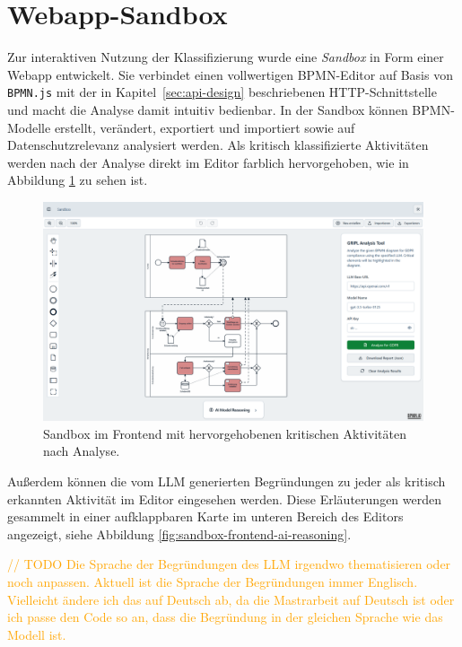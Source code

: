 \section{Webapp-Sandbox}\label{sec:nutzung-uber-webapp}

Zur interaktiven Nutzung der Klassifizierung wurde eine \emph{Sandbox} in Form einer Webapp entwickelt. Sie verbindet einen vollwertigen \ac{BPMN}-Editor auf Basis von \texttt{BPMN.js} \cite{bpmn-js} mit der in Kapitel~\ref{sec:api-design} beschriebenen HTTP-Schnittstelle und macht die Analyse damit intuitiv bedienbar. In der Sandbox können \ac{BPMN}-Modelle erstellt, verändert, exportiert und importiert sowie auf Datenschutzrelevanz analysiert werden. Als kritisch klassifizierte Aktivitäten werden nach der Analyse direkt im Editor farblich hervorgehoben, wie in Abbildung \ref{fig:sandbox-frontend-analyzed-model} zu sehen ist.

\begin{figure}
    \centering
    \includegraphics[width=\linewidth]{images/sandbox/sandbox-analyzed-model}
    \caption{Sandbox im Frontend mit hervorgehobenen kritischen Aktivitäten nach Analyse.}
    \label{fig:sandbox-frontend-analyzed-model}
\end{figure}

Außerdem können die vom \ac{LLM} generierten Begründungen zu jeder als kritisch erkannten Aktivität im Editor eingesehen werden. Diese Erläuterungen werden gesammelt in einer aufklappbaren Karte im unteren Bereich des Editors angezeigt, siehe Abbildung \ref{fig:sandbox-frontend-ai-reasoning}.

\textcolor{orange}{// TODO Die Sprache der Begründungen des LLM irgendwo thematisieren oder noch anpassen. Aktuell ist die Sprache der Begründungen immer Englisch. Vielleicht ändere ich das auf Deutsch ab, da die Mastrarbeit auf Deutsch ist oder ich passe den Code so an, dass die Begründung in der gleichen Sprache wie das Modell ist.}

